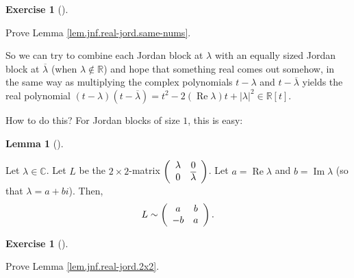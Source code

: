 \documentclass[numbers=enddot,12pt,final,onecolumn,notitlepage]{scrartcl}%
\newcounter{exer}
\numberwithin{exer}{subsection}
\theoremstyle{definition}
\newtheorem{lem}[theo]{Lemma}
\newenvironment{lemma}[1][]
{\begin{lem}[#1]\begin{leftbar}}
{\end{leftbar}\end{lem}}
\newtheorem{exmp}[exer]{Exercise}
\newenvironment{exercise}[1][]
{\begin{exmp}[#1]\begin{leftbar}}
{\end{leftbar}\end{exmp}}
\begin{document}
\begin{exercise}
 Prove Lemma \ref{lem.jnf.real-jord.same-nums}.
\end{exercise}

So we can try to combine each Jordan block at $\lambda$ with an equally sized
Jordan block at $\overline{\lambda}$ (when $\lambda\notin\mathbb{R}$) and hope
that something real comes out somehow, in the same way as multiplying the
complex polynomials $t-\lambda$ and $t-\overline{\lambda}$ yields the real
polynomial $\left(  t-\lambda\right)  \left(  t-\overline{\lambda}\right)
=t^{2}-2\left(  \operatorname*{Re}\lambda\right)  t+\left\vert \lambda
\right\vert ^{2}\in\mathbb{R}\left[  t\right]  $.

How to do this? For Jordan blocks of size $1$, this is easy:

\begin{lemma}
\label{lem.jnf.real-jord.2x2}Let $\lambda\in\mathbb{C}$. Let $L$ be the
$2\times2$-matrix $\left(
\begin{array}
[c]{cc}%
\lambda & 0\\
0 & \overline{\lambda}%
\end{array}
\right)  $. Let $a=\operatorname*{Re}\lambda$ and $b=\operatorname*{Im}%
\lambda$ (so that $\lambda=a+bi$). Then,%
\[
L\sim\left(
\begin{array}
[c]{cc}%
a & b\\
-b & a
\end{array}
\right)  .
\]

\end{lemma}

\begin{exercise}
 Prove Lemma \ref{lem.jnf.real-jord.2x2}.
\end{exercise}
\end{document}

